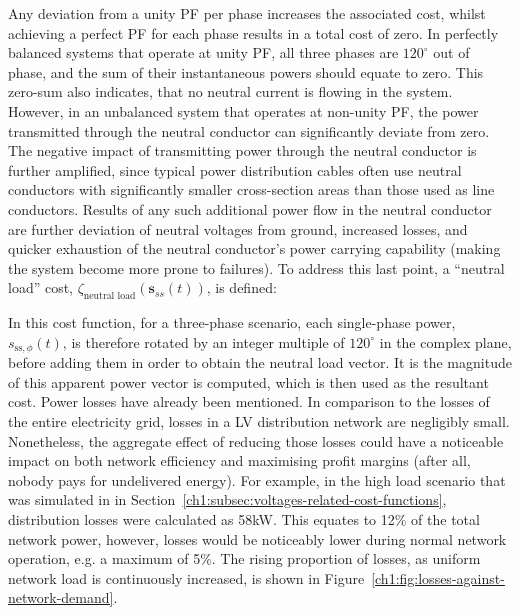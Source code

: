
Any deviation from a unity PF per phase increases the associated cost, whilst achieving a perfect PF for each phase results in a total cost of zero.
In perfectly balanced systems that operate at unity PF, all three phases are $120^\circ$ out of phase, and the sum of their instantaneous powers should equate to zero.
This zero-sum also indicates, that no neutral current is flowing in the system.
However, in an unbalanced system that operates at non-unity PF, the power transmitted through the neutral conductor can significantly deviate from zero.
The negative impact of transmitting power through the neutral conductor is further amplified, since typical power distribution cables often use neutral conductors with significantly smaller cross-section areas than those used as line conductors.
Results of any such additional power flow in the neutral conductor are further deviation of neutral voltages from ground, increased losses, and quicker exhaustion of the neutral conductor's power carrying capability (making the system become more prone to failures).
To address this last point, a ``neutral load'' cost, $\zeta_\text{neutral load}(\textbf{s}_{ss}(t))$, is defined:



In this cost function, for a three-phase scenario, each single-phase power, $s_{\text{ss},\phi}(t)$, is therefore rotated by an integer multiple of $120^\circ$ in the complex plane, before adding them in order to obtain the neutral load vector.
It is the magnitude of this apparent power vector is computed, which is then used as the resultant cost.
Power losses have already been mentioned.
In comparison to the losses of the entire electricity grid, losses in a LV distribution network are negligibly small.
Nonetheless, the aggregate effect of reducing those losses could have a noticeable impact on both network efficiency and maximising profit margins (after all, nobody pays for undelivered energy).
For example, in the high load scenario that was simulated in in Section~\ref{ch1:subsec:voltages-related-cost-functions}, distribution losses were calculated as 58kW.
This equates to 12\% of the total network power, however, losses would be noticeably lower during normal network operation, e.g. a maximum of 5\%.
The rising proportion of losses, as uniform network load is continuously increased, is shown in Figure~\ref{ch1:fig:losses-against-network-demand}.

